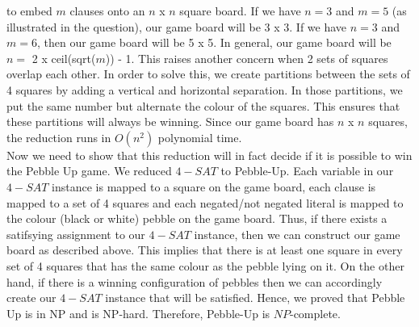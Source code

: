 \documentclass{csc_assignment}
\begin{document}
\begin{description}
to embed $m$ clauses onto an $n$ x $n$ square board. If we have $n = 3$ and $m = 5$ (as illustrated in the question), our game board will be 3 x 3. If we have $n = 3$ and $m = 6$, then our game board will be 5 x 5. In general, our game board will be $n =$ 2 x ceil(sqrt($m$)) - 1. This raises another concern when 2 sets of squares overlap each other.  In order to solve this, we create partitions between the sets of 4 squares by adding a vertical and horizontal separation. In those partitions, we put the same number but alternate the colour of the squares. This ensures that these partitions will always be winning. Since our game board has $n$ x $n$ squares, the reduction runs in $O(n^{2})$ polynomial time. \\ Now we need to show that this reduction will in fact decide if it is possible to win the Pebble Up game. We reduced $4-SAT$ to Pebble-Up. Each variable in our $4-SAT$ instance is mapped to a square on the game board, each clause is mapped to a set of 4 squares and each negated/not negated literal is mapped to the colour (black or white) pebble on the game board. Thus, if there exists a satifsying assignment to our $4-SAT$ instance, then we can construct our game board as described above. This implies that there is at least one square in every set of 4 squares that has the same colour as the pebble lying on it. On the other hand, if there is a winning configuration of pebbles then we can accordingly create our $4-SAT$ instance that will be satisfied. Hence, we proved that Pebble Up is in NP and is NP-hard. Therefore, Pebble-Up is $NP$-complete.




\end{description}
\end{document}
